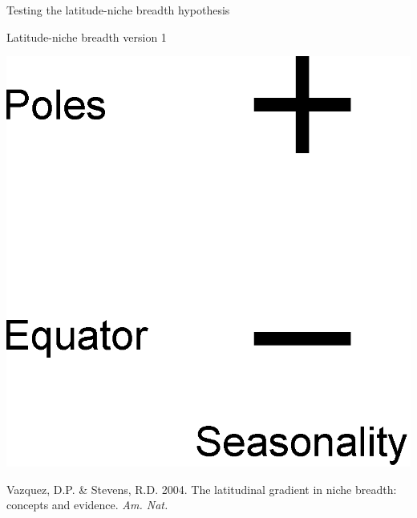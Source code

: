 \documentclass{beamer}
\begin{document}
  \begin{frame}{Testing the latitude-niche breadth hypothesis}

    \begin{block}{Latitude-niche breadth version 1}
    \begin{center}
      \includegraphics[width=.8\textwidth]{Figures/latitude_niche_breadth_1.eps}
    \end{center}

    \vspace{1cm}

    \tiny{Vazquez, D.P. \& Stevens, R.D. 2004. The latitudinal gradient in niche breadth: concepts and evidence. \emph{Am. Nat.}}
    \end{block}
  \end{frame}
\end{document}
